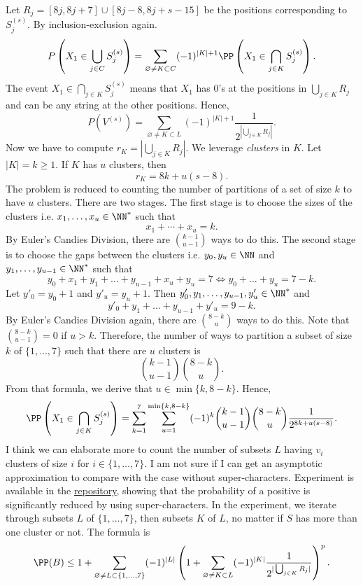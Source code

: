 Let $R_j = [8j, 8j+7] \cup [8j-8, 8j+s-15]$ be the positions corresponding to $S^{(s)}_j$. By inclusion-exclusion again.
$$P\left(X_1\in \bigcup_{j\in C} S^{(s)}_j\right) = \sum\limits_{\varnothing\ne K\subset C}(-1)^{|K|+1} \PP\left(X_1\in \bigcap\limits_{j\in K}S^{(s)}_j\right).$$
The event $X_1\in \bigcap\limits_{j\in K}S^{(s)}_j$ means that $X_1$ has $0$'s at the positions in $\bigcup_{j\in K} R_j$ and can be any string at the other positions. Hence,
$$P(V^{(s)}) = \sum\limits_{\varnothing\ne K\subset L}(-1)^{|K|+1} \dfrac{1}{2^{|\bigcup_{j\in K} R_j|}}.$$
Now we have to compute $r_K=|\bigcup_{j\in K} R_j|$. We leverage \textit{clusters} in $K$. Let $|K|=k\ge 1$. If $K$ has $u$ clusters, then
$$r_K=8k+u(s-8).$$
The problem is reduced to counting the number of partitions of a set of size $k$ to have $u$ clusters. There are two stages. The first stage is to choose the sizes of the clusters i.e. $x_1,\ldots,x_u \in \NN^*$ such that
$$x_1+\cdots+x_u=k.$$
By Euler's Candies Division, there are $\binom{k-1}{u-1}$ ways to do this. The second stage is to choose the gaps between the clusters i.e. $y_0,y_u\in\NN$ and $y_1,\ldots,y_{u-1}\in\NN^*$ such that
$$y_0+x_1+y_1+\ldots+y_{u-1}+x_u+y_u=7 \Leftrightarrow y_0+\ldots+y_u=7-k.$$
Let $y'_0 = y_0+1$ and $y'_u = y_u+1$. Then $y'_0,y_1,\ldots,y_{u-1},y'_u \in \NN^*$ and
$$y'_0+y_1+\ldots+y_{u-1}+y'_u = 9-k.$$
By Euler's Candies Division again, there are $\binom{8-k}{u}$ ways to do this. Note that $\binom{8-k}{u-1}=0$ if $u>k$. Therefore, the number of ways to partition a subset of size $k$ of $\{1,\ldots, 7\}$ such that there are $u$ clusters is
$$\binom{k-1}{u-1}\binom{8-k}{u}.$$
From that formula, we derive that $u\in\min\{k,8-k\}$. Hence,
$$\PP\left(X_1\in \bigcap\limits_{j\in K}S^{(s)}_j\right) = \sum\limits_{k=1}^7 \sum\limits_{u=1}^{\min\{k,8-k\}}(-1)^k \binom{k-1}{u-1}\binom{8-k}{u}\dfrac{1}{2^{8k+u(s-8)}}.$$
I think we can elaborate more to count the number of subsets $L$ having $v_i$ clusters of size $i$ for $i\in\{1,\ldots, 7\}$. I am not sure if I can get an asymptotic approximation to compare with the case without super-characters. Experiment is available in the \href{https://github.com/mintcd/string-matchers/blob/main/src/py_fdr/experiments/compare_supercharacter.ipynb}{repository}, showing that the probability of a positive is significantly reduced by using super-characters. In the experiment, we iterate through subsets $L$ of $\{1,\ldots,7\}$, then subsets $K$ of $L$, no matter if $S$ has more than one cluster or not. The formula is
$$\PP(B) \le 1+\sum\limits_{\varnothing\ne L\subset \{1,\ldots, 7\}} (-1)^{|L|}\left(1+\sum\limits_{\varnothing\neq K\subset L}(-1)^{|K|} \dfrac{1}{2^{|\bigcup_{j\in K} R_j|}}\right)^p.$$


